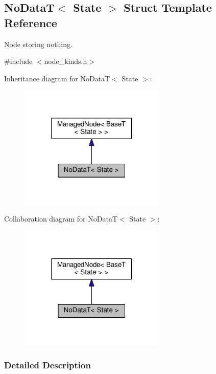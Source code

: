\hypertarget{structNoDataT}{}\subsection{No\+DataT$<$ State $>$ Struct Template Reference}
\label{structNoDataT}


Node storing nothing.  




{\ttfamily \#include $<$node\+\_\+kinds.\+h$>$}



Inheritance diagram for No\+DataT$<$ State $>$\+:\nopagebreak
\begin{figure}[H]
\begin{center}
\leavevmode
\includegraphics[width=197pt]{structNoDataT__inherit__graph}
\end{center}
\end{figure}


Collaboration diagram for No\+DataT$<$ State $>$\+:\nopagebreak
\begin{figure}[H]
\begin{center}
\leavevmode
\includegraphics[width=197pt]{structNoDataT__coll__graph}
\end{center}
\end{figure}


\subsubsection{Detailed Description}
